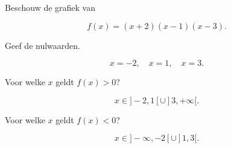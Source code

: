 \documentclass{ximera}
\begin{document}
\begin{oefening}{\oefB\ESS}

Beschouw de grafiek van

\[
f(x)=(x+2)(x-1)(x-3).
\]

\begin{center}
\end{center}

\begin{question}
Geef de nulwaarden.

\begin{oplossing}
\[
x=-2,\quad x=1,\quad x=3.
\]
\end{oplossing}
\end{question}

\begin{question}
Voor welke \(x\) geldt \(f(x)>0\)?

\begin{oplossing}
\[
x\in]-2,1[\cup]3,+\infty[.
\]
\end{oplossing}
\end{question}

\begin{question}
Voor welke \(x\) geldt \(f(x)<0\)?

\begin{oplossing}
\[
x\in]-\infty,-2[\cup]1,3[.
\]
\end{oplossing}
\end{question}

\end{oefening}
\end{document}
